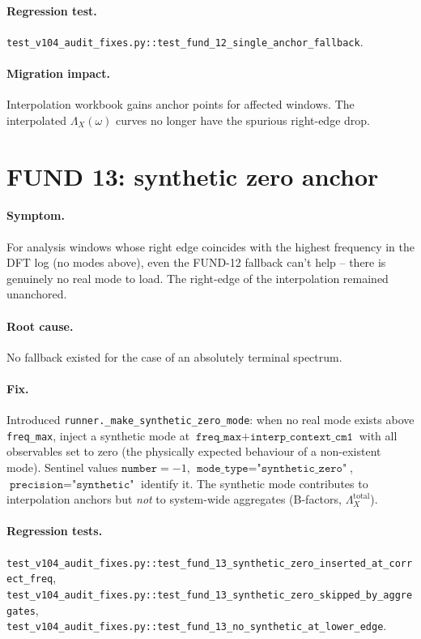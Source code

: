 \documentclass[10pt,a4paper,twoside]{article}
\newcommand{\fn}[1]{\texttt{#1}}
\newcommand{\cfgkey}[1]{\texttt{#1}}
\begin{document}
\paragraph{Regression test.}
\fn{test\_v104\_audit\_fixes.py::test\_fund\_12\_single\_anchor\_fallback}.

\paragraph{Migration impact.}
Interpolation workbook gains anchor points for affected windows.
The interpolated $\Lambda_X(\omega)$ curves no longer have the
spurious right-edge drop.

\section{FUND 13: synthetic zero anchor}
\label{sec:fund-13}

\paragraph{Symptom.}
For analysis windows whose right edge coincides with the highest
frequency in the DFT log (no modes above), even the FUND-12
fallback can't help -- there is genuinely no real mode to load.
The right-edge of the interpolation remained unanchored.

\paragraph{Root cause.}
No fallback existed for the case of an absolutely terminal
spectrum.

\paragraph{Fix.}
Introduced \fn{runner.\_make\_synthetic\_zero\_mode}: when no
real mode exists above \cfgkey{freq\_max}, inject a synthetic
mode at $\cfgkey{freq\_max} + \cfgkey{interp\_context\_cm1}$ with
all observables set to zero (the physically expected behaviour
of a non-existent mode). Sentinel values
$\texttt{number} = -1$, $\texttt{mode\_type} =
\texttt{"synthetic\_zero"}$, $\texttt{precision} =
\texttt{"synthetic"}$ identify it. The synthetic mode contributes
to interpolation anchors but \emph{not} to system-wide
aggregates (B-factors, $\Lambda_X^\text{total}$).

\paragraph{Regression tests.}
\fn{test\_v104\_audit\_fixes.py::test\_fund\_13\_synthetic\_zero\_inserted\_at\_correct\_freq},\\
\fn{test\_v104\_audit\_fixes.py::test\_fund\_13\_synthetic\_zero\_skipped\_by\_aggregates},\\
\fn{test\_v104\_audit\_fixes.py::test\_fund\_13\_no\_synthetic\_at\_lower\_edge}.
\end{document}
